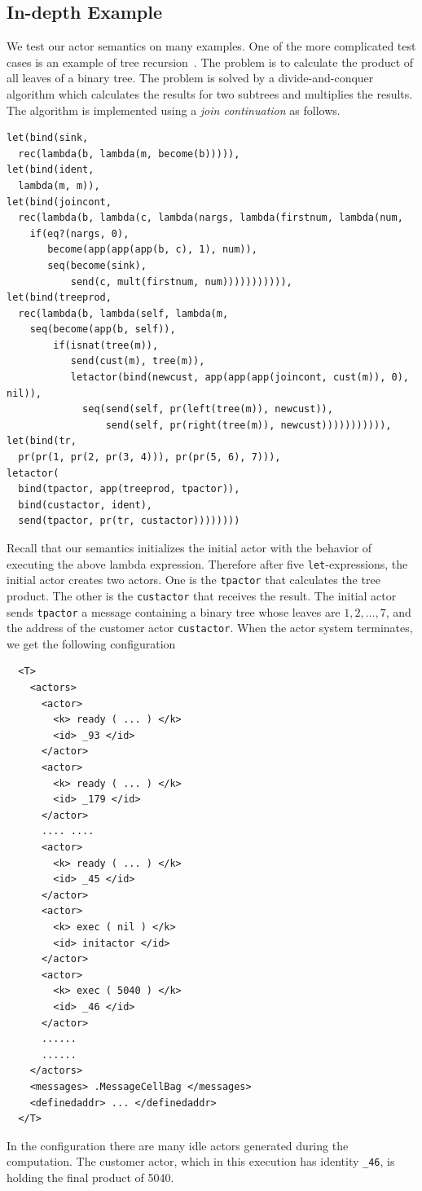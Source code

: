 \documentclass{llncs}
\begin{document}
\subsection{In-depth Example}
We test our actor semantics on many examples. One of the more complicated test
cases is an example of tree recursion~\cite{actor}.  The problem is to calculate
the product of all leaves of a binary tree.  The problem is solved by a
divide-and-conquer algorithm which calculates the results for two subtrees and
multiplies the results.  The algorithm is implemented using a
\emph{join continuation} as follows.
\small
\begin{verbatim}
let(bind(sink,
  rec(lambda(b, lambda(m, become(b))))),
let(bind(ident,
  lambda(m, m)),
let(bind(joincont,
  rec(lambda(b, lambda(c, lambda(nargs, lambda(firstnum, lambda(num,
    if(eq?(nargs, 0),
       become(app(app(app(b, c), 1), num)),
       seq(become(sink),
           send(c, mult(firstnum, num))))))))))),
let(bind(treeprod,
  rec(lambda(b, lambda(self, lambda(m,
    seq(become(app(b, self)),
        if(isnat(tree(m)),
           send(cust(m), tree(m)),
           letactor(bind(newcust, app(app(app(joincont, cust(m)), 0), nil)),
             seq(send(self, pr(left(tree(m)), newcust)),
                 send(self, pr(right(tree(m)), newcust))))))))))),
let(bind(tr, 
  pr(pr(1, pr(2, pr(3, 4))), pr(pr(5, 6), 7))),
letactor(
  bind(tpactor, app(treeprod, tpactor)),
  bind(custactor, ident),
  send(tpactor, pr(tr, custactor))))))))
\end{verbatim}
\normalsize
Recall that our semantics initializes the initial actor with the behavior of 
executing the above lambda expression.
Therefore after five \texttt{let}-expressions, the initial actor creates two 
actors. One is the \texttt{tpactor} that calculates the tree product.
The other is the \texttt{custactor} that receives the result.
The initial actor sends \texttt{tpactor} a message containing a binary tree 
whose leaves are $1, 2, \dots, 7$, and the address of the customer actor 
\texttt{custactor}.
When the actor system terminates, we get the following configuration
\begin{verbatim}
  <T>
    <actors>
      <actor>
        <k> ready ( ... ) </k>
        <id> _93 </id>
      </actor>
      <actor>
        <k> ready ( ... ) </k>
        <id> _179 </id>
      </actor>
      .... ....
      <actor>
        <k> ready ( ... ) </k>
        <id> _45 </id>
      </actor>
      <actor>
        <k> exec ( nil ) </k>
        <id> initactor </id>
      </actor>
      <actor>
        <k> exec ( 5040 ) </k>
        <id> _46 </id>
      </actor>
      ......
      ......
    </actors>
    <messages> .MessageCellBag </messages>
    <definedaddr> ... </definedaddr>
  </T>
\end{verbatim}
In the configuration there are many idle actors generated during the 
computation. The customer actor, which in this execution has identity 
\texttt{\_46}, is holding the final product of 5040.
\end{document}
